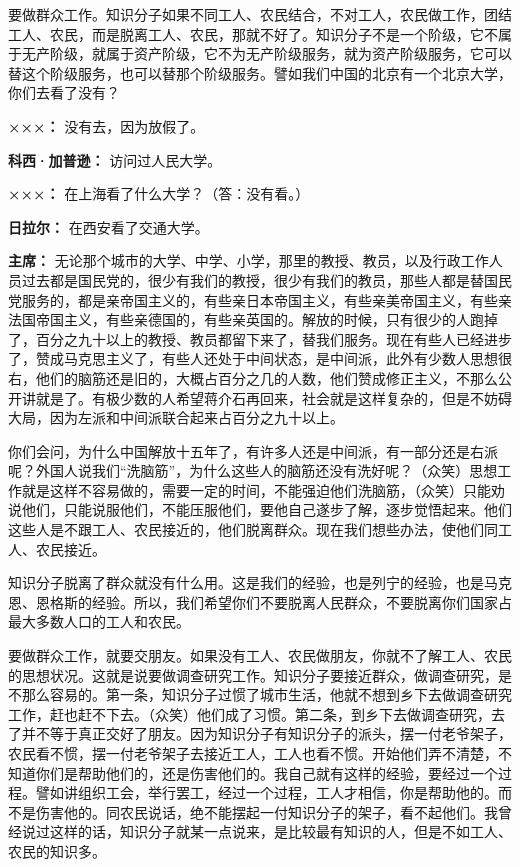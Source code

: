 \begin{list}{}
要做群众工作。知识分子如果不同工人、农民结合，不对工人，农民做工作，团结工人、农民，而是脱离工人、农民，那就不好了。知识分子不是一个阶级，它不属于无产阶级，就属于资产阶级，它不为无产阶级服务，就为资产阶级服务，它可以替这个阶级服务，也可以替那个阶级服务。譬如我们中国的北京有一个北京大学，你们去看了没有？

\item[\textbf{×××：}] 没有去，因为放假了。

\item[\textbf{科西·加普逊：}] 访问过人民大学。

\item[\textbf{×××：}] 在上海看了什么大学？（答：没有看。）

\item[\textbf{日拉尔：}] 在西安看了交通大学。

\item[\textbf{主席：}] 无论那个城市的大学、中学、小学，那里的教授、教员，以及行政工作人员过去都是国民党的，很少有我们的教授，很少有我们的教员，那些人都是替国民党服务的，都是亲帝国主义的，有些亲日本帝国主义，有些亲美帝国主义，有些亲法国帝国主义，有些亲德国的，有些亲英国的。解放的时候，只有很少的人跑掉了，百分之九十以上的教授、教员都留下来了，替我们服务。现在有些人已经进步了，赞成马克思主义了，有些人还处于中间状态，是中间派，此外有少数人思想很右，他们的脑筋还是旧的，大概占百分之几的人数，他们赞成修正主义，不那么公开讲就是了。有极少数的人希望蒋介石再回来，社会就是这样复杂的，但是不妨碍大局，因为左派和中间派联合起来占百分之九十以上。

你们会问，为什么中国解放十五年了，有许多人还是中间派，有一部分还是右派呢？外国人说我们“洗脑筋”，为什么这些人的脑筋还没有洗好呢？（众笑）思想工作就是这样不容易做的，需要一定的时间，不能强迫他们洗脑筋，（众笑）只能劝说他们，只能说服他们，不能压服他们，要他自己遂步了解，逐步觉悟起来。他们这些人是不跟工人、农民接近的，他们脱离群众。现在我们想些办法，使他们同工人、农民接近。

知识分子脱离了群众就没有什么用。这是我们的经验，也是列宁的经验，也是马克恩、恩格斯的经验。所以，我们希望你们不要脱离人民群众，不要脱离你们国家占最大多数人口的工人和农民。

要做群众工作，就要交朋友。如果没有工人、农民做朋友，你就不了解工人、农民的思想状况。这就是说要做调查研究工作。知识分子要接近群众，做调查研究，是不那么容易的。第一条，知识分子过惯了城市生活，他就不想到乡下去做调查研究工作，赶也赶不下去。（众笑）他们成了习惯。第二条，到乡下去做调查研究，去了并不等于真正交好了朋友。因为知识分子有知识分子的派头，摆一付老爷架子，农民看不惯，摆一付老爷架子去接近工人，工人也看不惯。开始他们弄不清楚，不知道你们是帮助他们的，还是伤害他们的。我自己就有这样的经验，要经过一个过程。譬如讲组织工会，举行罢工，经过一个过程，工人才相信，你是帮助他的。而不是伤害他的。同农民说话，绝不能摆起一付知识分子的架子，看不起他们。我曾经说过这样的话，知识分子就某一点说来，是比较最有知识的人，但是不如工人、农民的知识多。


\end{list}
